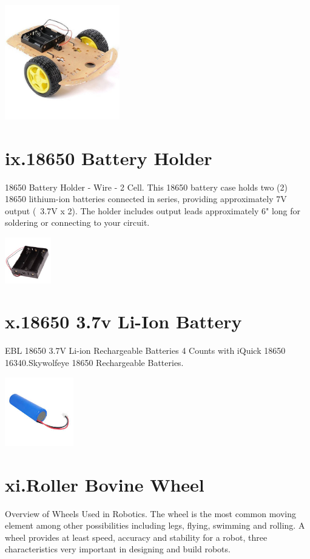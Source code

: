 \documentclass[12pt]{article}
\begin{document}
\includegraphics[height=5cm]{C.jpg}
\pagebreak
\section*{ix.18650 Battery Holder}
18650 Battery Holder - Wire - 2 Cell. This 18650 battery case holds two (2) 18650 lithium-ion batteries connected in series, providing approximately 7V output (~3.7V x 2). The holder includes output leads approximately 6" long for soldering or connecting to your circuit.

\includegraphics[height=2cm]{BE.jpg}

\section*{x.18650 3.7v Li-Ion Battery}
EBL 18650 3.7V Li-ion Rechargeable Batteries 4 Counts with iQuick 18650 16340.Skywolfeye 18650 Rechargeable Batteries.

\includegraphics[height=3cm]{BEE.jpg}

\section*{xi.Roller Bovine Wheel}
Overview of Wheels Used in Robotics. The wheel is the most common moving element among other possibilities including legs, flying, swimming and rolling. A wheel provides at least speed, accuracy and stability for a robot, three characteristics very important in designing and build robots.
\end{document}
